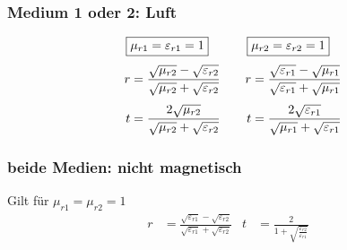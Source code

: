 \subsubsection{Medium 1 oder 2: Luft}
\begin{equation*}
	\setlength{\jot}{6pt}
	\begin{aligned}[t]
   		\Aboxed{ & \mu_{r1} = \varepsilon_{r1} = 1}                                                            \\
		r        & = \frac{\sqrt{\mu_{r2}}-\sqrt{\varepsilon_{r2}}}{{\sqrt{\mu_{r2}}+\sqrt{\varepsilon_{r2}}}} \\
		t        & = \frac{2\sqrt{\mu_{r2}}}{\sqrt{\mu_{r2}}+\sqrt{\varepsilon_{r2}}}
	\end{aligned}
	\qquad
	\begin{aligned}[t]
  		\Aboxed{ & \mu_{r2} = \varepsilon_{r2} = 1}                                                            \\
		r        & = \frac{\sqrt{\varepsilon_{r1}}-\sqrt{\mu_{r1}}}{{\sqrt{\varepsilon_{r1}}+\sqrt{\mu_{r1}}}} \\
		t        & = \frac{2\sqrt{\varepsilon_{r1}}}{\sqrt{\mu_{r1}}+\sqrt{\varepsilon_{r1}}}
	\end{aligned}
\end{equation*}

%


\subsubsection{beide Medien: nicht magnetisch}
Gilt für $\mu_{r1} = \mu_{r2} = 1$
\begin{align*}
    r        & = \frac{\sqrt{\varepsilon_{r1}}-\sqrt{\varepsilon_{r2}}}{{\sqrt{\varepsilon_{r1}}+\sqrt{\varepsilon_{r2}}}}&
    t        & = \frac{2}{1+\sqrt{\frac{\varepsilon_{r2}}{\varepsilon_{r1}}}}&
\end{align*}

